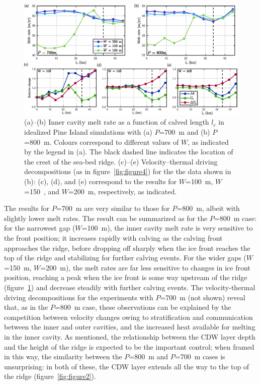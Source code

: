 \documentclass[draft]{agujournal2019}
\begin{document}
\begin{figure}
    \centering
    \includegraphics[width = \textwidth]{../make_figures/plots/figure8.eps}
    \caption{(a)--(b) Inner cavity melt rate as a function of calved length $l_c$ in idealized Pine Island simulations with (a) $P$=700~m and (b) $P$=800~m. Colours correspond to different values of $W$, as indicated by the legend in (a). The black dashed line indicates the location of the crest of the sea-bed ridge. (c)--(e) Velocity--thermal driving decompositions (as in figure~\ref{fig:figure4}) for the the data shown in (b): (c), (d), and (e) correspond to the results for $W$=100~m, $W$=150~, and $W$=200~m, respectively, as indicated. }
    \label{fig:figure8}
\end{figure}

The results for $P$=700~m are very similar to those for $P$=800~m, albeit with slightly lower melt rates. The result can be summarized as for the $P$=800~m case: for the narrowest gap ($W$=100~m), the inner cavity melt rate is very sensitive to the front position; it increases rapidly with calving as the calving front approaches the ridge, before dropping off sharply when the ice front reaches the top of the ridge and stabilizing for further calving events. For the wider gaps ($W$=150~m, $W$=200~m), the melt rates are far less sensitive to changes in ice front position, reaching a peak when the ice front is some way upstream of the ridge (figure~\ref{fig:figure8}) and decrease steadily with further calving events. The velocity-thermal driving decompositions for the experiments with $P$=700~m (not shown) reveal that, as in the $P$=800~m case, these observations can be explained by the competition between velocity changes owing to stratification and communication between the inner and outer cavities, and the increased heat available for melting in the inner cavity. As mentioned, the relationship between the CDW layer depth and the height of the ridge is expected to be the important control; when framed in this way, the similarity between the $P$=800~m and $P$=700~m cases is unsurprising: in both of these, the CDW layer extends all the way to the top of the ridge (figure~\ref{fig:figure2}).
\end{document}
